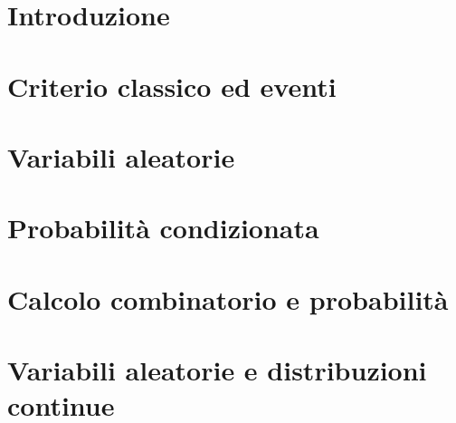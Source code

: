 \documentclass[12pt]{article}
\begin{document}


\tableofcontents
\restoregeometry

\section{Introduzione}


\section{Criterio classico ed eventi}


\section{Variabili aleatorie}


\section{Probabilità condizionata}


\section{Calcolo combinatorio e probabilità}


\section{Variabili aleatorie e distribuzioni continue}

\end{document}
